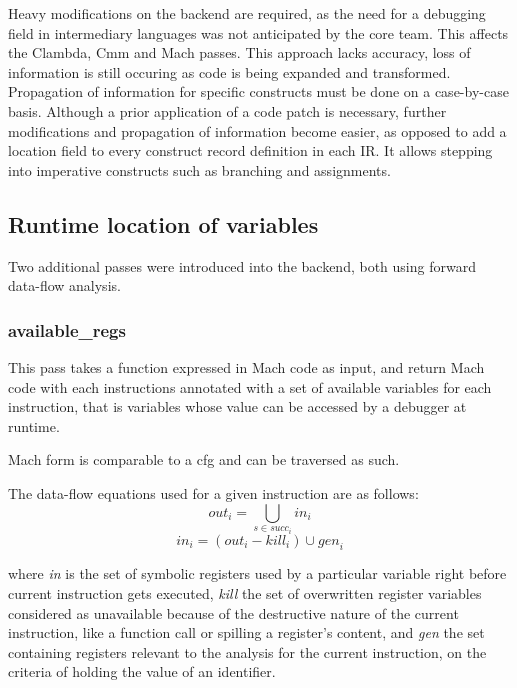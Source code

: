 \begin{itemize}
\fail
Heavy modifications on the backend are required, as the need for a debugging
field in intermediary languages was not anticipated by the core team. This
affects the Clambda, Cmm and Mach passes.
\fail This approach lacks accuracy, loss of information is still occuring as code
is being expanded and transformed. Propagation of information for specific constructs
must be done on a case-by-case basis.
\tick Although a prior application of a code patch is necessary, further modifications
and propagation of information become easier, as opposed to add a location field
to every construct record definition in each IR.
\tick It allows stepping into imperative constructs such as branching and
assignments.
\end{itemize}

\subsection{Runtime location of variables}

Two additional passes were introduced into the backend, both using
forward data-flow analysis.

\clearpage
\subsubsection{available\_regs}

This pass takes a function expressed in Mach code as input, and
return Mach code with each instructions annotated
with a set of available variables for each instruction, that is variables whose
value can be accessed by a debugger at runtime.

Mach form is comparable to a \gls{cfg} and can be traversed as such.

The data-flow equations used for a given instruction are as follows:
\[
    \textit{out}_{i} = \bigcup_{s \in succ_{i}} \textit{in}_{i}
\]
\[
    \textit{in}_{i} = (\textit{out}_{i} - \textit{kill}_{i}) \cup \textit{gen}_{i}
\]

where \textit{in} is the set of symbolic registers used by a particular variable right before
current instruction gets executed,
\textit{kill} the set of overwritten register variables considered as unavailable
because of the destructive nature of the current instruction, like a function
call or spilling a register's content,
and \textit{gen} the set containing registers relevant to the
analysis for the current instruction, on the criteria of holding the value of an identifier.

